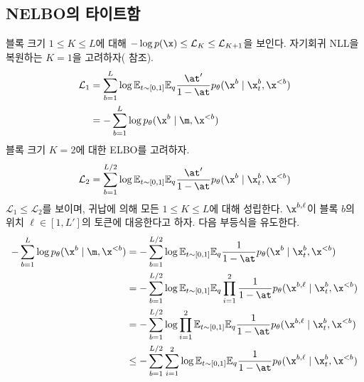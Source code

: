 \documentclass{article} %
\begin{document}

\subsection{NELBO의 타이트함}\label{supp:sar-elbo-tightness}
블록 크기 $1 \leq K \leq L$에 대해 $-\log p(\x) \leq \mathcal{L}_{K} \leq \mathcal{L}_{K+1}$을 보인다. 자기회귀 NLL을 복원하는 $K=1$을 고려하자( 참조).
\begin{align}
    \mathcal{L}_1 &= \sum_{b=1}^{L} \log \mathbb{E}_{t \sim [0, 1]} \mathbb{E}_q \frac{\at'}{1-\at} p_\theta(\x^b \mid \x_t^b,\x^{<b}) \nonumber \\
    &= - \sum_{b=1}^{L}  \log p_\theta(\x^b \mid \m,\x^{<b})
\end{align}
블록 크기 $K=2$에 대한 ELBO를 고려하자.
\begin{align}
    \mathcal{L}_2 = \sum_{b=1}^{L/2} \log \mathbb{E}_{t \sim [0, 1]} \mathbb{E}_q \frac{\at'}{1-\at} p_\theta(\x^b \mid \x_t^b, \x^{<b})
\end{align}
$\mathcal{L}_1 \leq \mathcal{L}_2$를 보이며, 귀납에 의해 모든 $1 \leq K \leq L$에 대해 성립한다. $\x^{b, \ell}$이 블록 $b$의 위치 $\ell \in [1, L']$의 토큰에 대응한다고 하자. 다음 부등식을 유도한다.
\begin{align}
    - \sum_{b=1}^{L} \log  p_\theta(\x^b \mid \m, \x^{<b}) &= -\sum_{b=1}^{L/2} \log \mathbb{E}_{t \sim [0, 1]} \mathbb{E}_q \frac{1}{1-\at} p_\theta(\x^b \mid \x_t^b, \x^{<b}) \nonumber \\
    &= - \sum_{b=1}^{L/2} \log \mathbb{E}_{t \sim [0, 1]} \mathbb{E}_q \prod_{i=1}^2 \frac{1}{1-\at} p_\theta(\x^{b, \ell} \mid \x_t^b, \x^{<b}) \nonumber \\
    &= - \sum_{b=1}^{L/2} \log \prod_{i=1}^2\mathbb{E}_{t \sim [0, 1]} \mathbb{E}_q \frac{1}{1-\at} p_\theta(\x^{b, \ell} \mid \x_t^b, \x^{<b}) \nonumber \\
    &\leq - \sum_{b=1}^{L/2} \sum_{i=1}^2 \log \mathbb{E}_{t \sim [0, 1]} \mathbb{E}_q \frac{1}{1-\at} p_\theta(\x^{b, \ell} \mid \x_t^b, \x^{<b})
\end{align}
\end{document}
